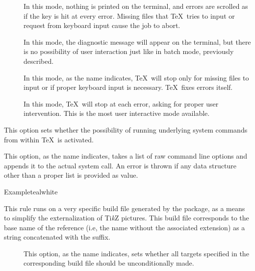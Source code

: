 \begin{description}
\begin{description}
\begin{description}
\item[] In this mode, nothing is printed on the terminal, and errors are scrolled as if the  key is hit at every error. Missing files that \TeX\ tries to input or request from keyboard input cause the job to abort.

\item[] In this mode, the diagnostic message will appear on the terminal, but there is no possibility of user interaction just like in batch mode, previously described.

\item[] In this mode, as the name indicates, \TeX\ will stop only for missing files to input or if proper keyboard input is necessary. \TeX\ fixes errors itself.

\item[] In this mode, \TeX\ will stop at each error, asking for proper user intervention. This is the most user interactive mode available.
\end{description}

\item[\rpsbox{shell}] This option sets whether the possibility of running underlying system commands from within \TeX\ is activated.

\item[\abox{options}] This option, as the name indicates, takes a list of raw command line options and appends it to the actual system call. An error is thrown if any data structure other than a proper list is provided as value.
\end{description}

\begin{codebox}{Example}{teal}{\icnote}{white}
\end{codebox}

\item[\rulebox{tikzmake}{Robbie Smith, Paulo Cereda}] This rule runs  on a very specific build file generated by the  package, as a means to simplify the externalization of Ti{\itshape k}Z pictures. This build file corresponds to the base name of the  reference (i.e, the name without the associated extension) as a string concatenated with the  suffix.

\begin{description}
\item[] This option, as the name indicates, sets whether all targets specified in the corresponding build file should be unconditionally made.


\end{description}
\end{description}
